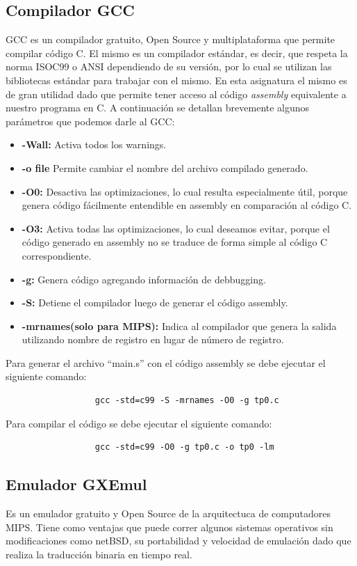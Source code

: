 	\subsection{Compilador GCC}
		GCC es un compilador gratuito, Open Source y multiplataforma que permite compilar código C. 
		El mismo es un compilador estándar, es decir, que respeta la norma ISOC99 o ANSI dependiendo de su versión, por lo cual se utilizan las 
		bibliotecas estándar para trabajar con el mismo. En esta asignatura el mismo es de gran utilidad dado que permite tener acceso  al código 
		\emph{assembly} equivalente a nuestro programa en C. A continuación se detallan brevemente algunos parámetros que podemos darle al GCC:
		\begin{itemize}
			\item \textbf{-Wall:} Activa todos los warnings.
			\item \textbf{-o file} Permite cambiar el nombre del archivo compilado generado.
			\item \textbf{-O0:} Desactiva las optimizaciones, lo cual resulta especialmente útil, porque genera código fácilmente entendible en 
			assembly en comparación al código C.
			\item \textbf{-O3:} Activa todas las optimizaciones, lo cual deseamos evitar, porque el código generado en assembly no se traduce de
			forma simple al código C correspondiente.
			\item \textbf{-g:} Genera código agregando información de debbugging.
			\item \textbf{-S:} Detiene el compilador luego de generar el código assembly.
			\item \textbf{-mrnames(solo para MIPS):} Indica al compilador que genera la salida utilizando nombre de registro en lugar de número de registro.
		\end{itemize}
		Para generar el archivo ``main.s'' con el código assembly se debe ejecutar el siguiente comando: 
		  \begin{verbatim}
			      gcc -std=c99 -S -mrnames -O0 -g tp0.c
		  \end{verbatim}
		Para compilar el código se debe ejecutar el siguiente comando:
		\begin{verbatim}
			      gcc -std=c99 -O0 -g tp0.c -o tp0 -lm
		 \end{verbatim}
		\vspace{0.5cm}
		
	\subsection{Emulador GXEmul}
		Es un emulador gratuito y Open Source de la arquitectuca de computadores MIPS. Tiene como ventajas que puede correr algunos sistemas operativos
		sin modificaciones como netBSD, su portabilidad y velocidad de emulación dado que realiza la traducción binaria en tiempo real. 
		\vspace{0.5cm}
		
